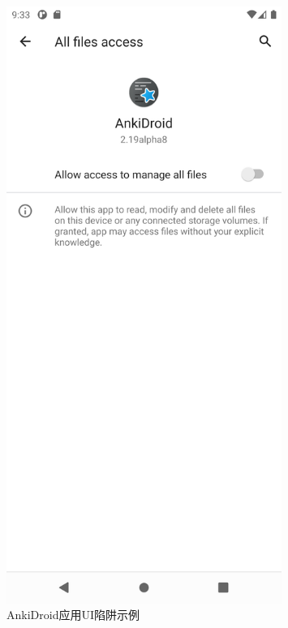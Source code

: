 \documentclass[UTF8, fontset=windows]{article}
\begin{document}
\begin{figure}[ht!]
\begin{minipage}
            \caption{Omninotes应用UI陷阱示例}
            \label{fig:ui_trap_example1}
        \end{minipage}
    \hfill
    \begin{minipage}
        [t]{0.4\textwidth}
            \centering
            \includegraphics[width=0.8\textwidth]{1.png}
            \caption{AnkiDroid应用UI陷阱示例}
            \label{fig:ui_trap_example2}
        \end{minipage}
\end{figure}
\end{document}
